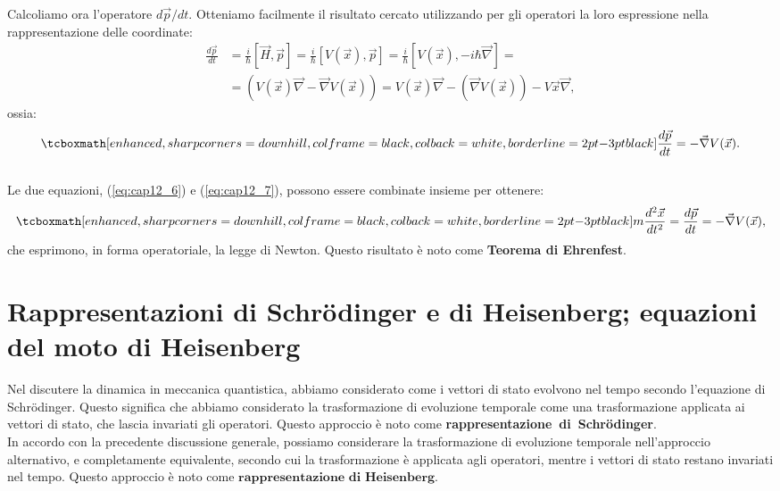 Calcoliamo ora l'operatore ${d\vec{p}}/{dt}$. Otteniamo facilmente il risultato cercato utilizzando per gli operatori la loro espressione nella rappresentazione delle coordinate:\\
	\begin{align}
		\frac{d\vec{p}}{dt}&=\frac{i}{\hbar}[\vec{H},\vec{p}]=\frac{i}{\hbar}[V(\vec{x}),\vec{p}]=  \frac{i}{\hbar}[V(\vec{x}),-i\hbar\vec{\nabla}]= \nonumber \\
		&= (V(\vec{x})\vec{\nabla}-\vec{\nabla}V(\vec{x}))= V(\vec{x})\vec{\nabla}-(\vec{\nabla}V(\vec{x}))-V	\vec{x}\vec{\nabla},
	\end{align}
ossia:
	\begin{equation}
	\label{eq:cap12_7}
		\tcboxmath[enhanced, sharp corners=downhill, colframe=black, colback=white, borderline={2pt}{-3pt}{black}]{
			\frac{d\vec{p}}{dt}=-\vec{\nabla}V(\vec{x}).
			}
	\end{equation}\\
	
Le due equazioni, (\ref{eq:cap12_6}) e (\ref{eq:cap12_7}), possono essere combinate insieme per ottenere:\\
	\begin{equation}
		\tcboxmath[enhanced, sharp corners=downhill, colframe=black, colback=white, borderline={2pt}{-3pt}{black}]{
			m\frac{d^2\vec{x}}{dt^2}=\frac{d\vec{p}}{dt}=-\vec{\nabla}V(\vec{x}),
			}
	\end{equation}
che esprimono, in forma operatoriale, la legge di Newton. Questo risultato è noto come \textbf{Teorema di Ehrenfest}. 

\section[Rappresentazioni di Schrödinger e di Heisenberg]{Rappresentazioni di Schrödinger e di Heisenberg; equazioni  del moto di Heisenberg}

Nel discutere la dinamica in meccanica quantistica, abbiamo considerato come i vettori di stato evolvono nel tempo secondo l'equazione di Schrödinger. Questo significa che abbiamo considerato la trasformazione di evoluzione temporale come una trasformazione applicata ai vettori di stato, che lascia invariati gli operatori. Questo approccio è noto come \textbf{rappresentazione~di~Schr\"{o}dinger}.\\

In accordo con la precedente discussione generale, possiamo considerare la trasformazione di evoluzione temporale nell'approccio alternativo, e completamente equivalente, secondo cui la trasformazione è applicata agli operatori, mentre i vettori di stato restano invariati nel tempo. Questo approccio è noto come $\textbf{rappresentazione~di~Heisenberg}$.\\


